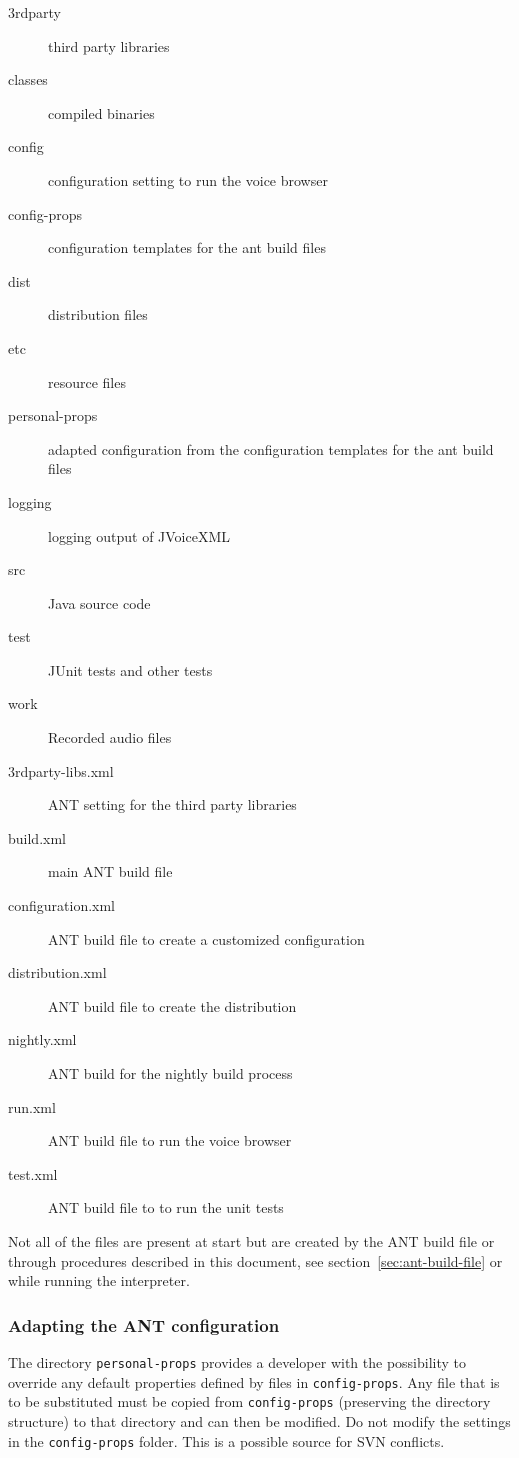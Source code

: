 \documentclass[11pt,a4paper]{article}
\begin{document}
\begin{description}
\item[3rdparty] third party libraries
\item[classes] compiled binaries
\item[config] configuration setting to run the voice browser
\item[config-props] configuration templates for the ant build files
\item[dist] distribution files
\item[etc] resource files
\item[personal-props] adapted configuration from the configuration templates
for the ant build files
\item[logging] logging output of JVoiceXML
\item[src] Java source code
\item[test] JUnit tests and other tests
\item[work] Recorded audio files
\item[3rdparty-libs.xml] ANT setting for the third party libraries
\item[build.xml] main ANT build file
\item[configuration.xml] ANT build file to create a customized configuration
\item[distribution.xml] ANT build file to create the distribution
\item[nightly.xml] ANT build for the nightly build process
\item[run.xml] ANT build file to run the voice browser
\item[test.xml] ANT build file to to run the unit tests
\end{description}

Not all of the files are present at start but are created by the
ANT build file or through procedures described in this 
document, see section~\ref{sec:ant-build-file} or while running the interpreter.

\subsubsection{Adapting the ANT configuration}

The directory \texttt{personal-props} provides a developer with the 
possibility to override any 
default properties defined by files in \texttt{config-props}. 
Any file that is to be
substituted must be copied from \texttt{config-props} 
(preserving the directory structure) to that directory and can then be 
modified. Do not modify the settings in the \texttt{config-props} folder. This
is a possible source for SVN conflicts.
\end{document}
